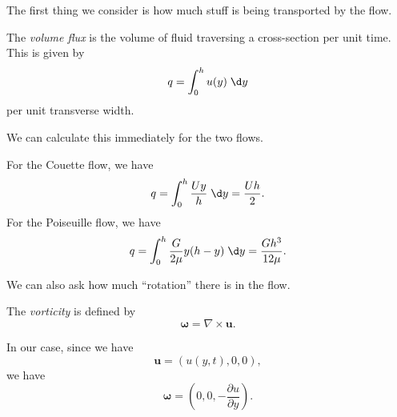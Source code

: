 \documentclass[a4paper]{article}
\begin{document}
The first thing we consider is how much stuff is being transported by the flow.
\begin{defi}
  The \emph{volume flux} is the volume of fluid traversing a cross-section per unit time. This is given by
  \[
    q = \int_0^h u(y) \;\d y
  \]
  per unit transverse width.
\end{defi}
We can calculate this immediately for the two flows.

\begin{eg}
  For the Couette flow, we have
  \[
    q = \int_0^h \frac{Uy}{h}\;\d y = \frac{Uh}{2}.
  \]
  For the Poiseuille flow, we have
  \[
    q = \int_0^h \frac{G}{2\mu} y (h - y)\;\d y = \frac{Gh^3}{12 \mu}.
  \]
\end{eg}

We can also ask how much ``rotation'' there is in the flow.
\begin{defi}[Vorticity]
  The \emph{vorticity} is defined by
  \[
    \boldsymbol\omega = \nabla \times \mathbf{u}.
  \]
\end{defi}
In our case, since we have
\[
  \mathbf{u} = (u(y, t), 0, 0),
\]
we have
\[
  \boldsymbol\omega = \left(0, 0, -\frac{\partial u}{\partial y}\right).
\]
\end{document}
